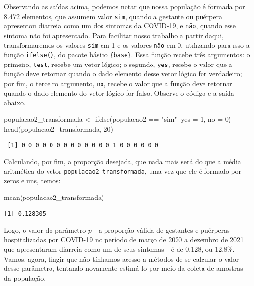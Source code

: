 \documentclass[
  letterpaper,
  DIV=11,
  numbers=noendperiod]{scrreprt}
\newenvironment{Shaded}{\begin{snugshade}}{\end{snugshade}}
\newcommand{\AttributeTok}[1]{\textcolor[rgb]{0.40,0.45,0.13}{#1}}
\newcommand{\DecValTok}[1]{\textcolor[rgb]{0.68,0.00,0.00}{#1}}
\newcommand{\FunctionTok}[1]{\textcolor[rgb]{0.28,0.35,0.67}{#1}}
\newcommand{\NormalTok}[1]{\textcolor[rgb]{0.00,0.23,0.31}{#1}}
\newcommand{\OtherTok}[1]{\textcolor[rgb]{0.00,0.23,0.31}{#1}}
\newcommand{\SpecialCharTok}[1]{\textcolor[rgb]{0.37,0.37,0.37}{#1}}
\newcommand{\StringTok}[1]{\textcolor[rgb]{0.13,0.47,0.30}{#1}}
\begin{document}
Observando as saídas acima, podemos notar que nossa população é formada
por 8.472 elementos, que assumem valor \texttt{sim}, quando a gestante
ou puérpera apresentou diarreia como um dos sintomas da COVID-19, e
\texttt{não}, quando esse sintoma não foi apresentado. Para facilitar
nosso trabalho a partir daqui, transformaremos os valores \texttt{sim}
em 1 e os valores \texttt{não} em 0, utilizando para isso a função
\texttt{ifelse()}, do pacote básico \texttt{\{base\}}. Essa função
recebe três argumentos: o primeiro, \texttt{test}, recebe um vetor
lógico; o segundo, \texttt{yes}, recebe o valor que a função deve
retornar quando o dado elemento desse vetor lógico for verdadeiro; por
fim, o terceiro argumento, \texttt{no}, recebe o valor que a função deve
retornar quando o dado elemento do vetor lógico for falso. Observe o
código e a saída abaixo.

\begin{Shaded}
\begin{Highlighting}[]
\NormalTok{populacao2\_transformada }\OtherTok{\textless{}{-}} \FunctionTok{ifelse}\NormalTok{(populacao2 }\SpecialCharTok{==} \StringTok{"sim"}\NormalTok{, }\AttributeTok{yes =} \DecValTok{1}\NormalTok{, }\AttributeTok{no =} \DecValTok{0}\NormalTok{)}
\FunctionTok{head}\NormalTok{(populacao2\_transformada, }\DecValTok{20}\NormalTok{)}
\end{Highlighting}
\end{Shaded}

\begin{verbatim}
 [1] 0 0 0 0 0 0 0 0 0 0 0 0 0 1 0 0 0 0 0 0
\end{verbatim}

Calculando, por fim, a proporção desejada, que nada mais será do que a
média aritmética do vetor \texttt{populacao2\_transformada}, uma vez que
ele é formado por zeros e uns, temos:

\begin{Shaded}
\begin{Highlighting}[]
\FunctionTok{mean}\NormalTok{(populacao2\_transformada)}
\end{Highlighting}
\end{Shaded}

\begin{verbatim}
[1] 0.128305
\end{verbatim}

Logo, o valor do parâmetro \(p\) - a proporção válida de gestantes e
puérperas hospitalizadas por COVID-19 no período de março de 2020 a
dezembro de 2021 que apresentaram diarreia como um de seus sintomas - é
de 0,128, ou 12,8\%. Vamos, agora, fingir que não tínhamos acesso a
métodos de se calcular o valor desse parâmetro, tentando novamente
estimá-lo por meio da coleta de amostras da população.
\end{document}
